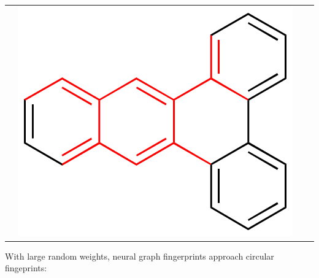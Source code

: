 \documentclass[landscape,a0b,final,a4resizeable]{include/a0poster}
\begin{document}
\begin{poster}
\begin{multicols}{3}
\begin{center}
\begin{tabular}{>{\centering}m{\mywidthb} >{\centering}m{\mywidtha} >{\centering}m{\mywidtha} >{\centering\arraybackslash}m{\mywidtha}}
& \includegraphics[width=\mywidtha]{figures/jorge-figures/12.png}\\
\end{tabular}
\vspace{-3mm}
\end{center}






\newpage %



With large random weights, neural graph fingerprints approach circular fingeprints:


\end{multicols}
\end{poster}
\end{document}

